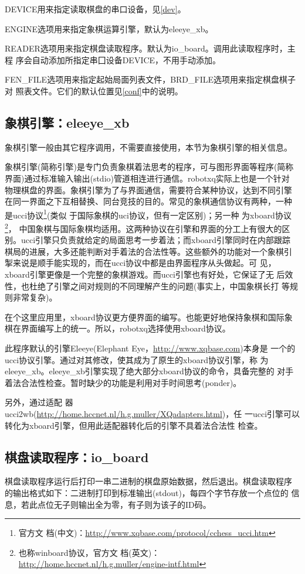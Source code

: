\documentclass[a4paper]{article}
\begin{document}
DEVICE用来指定读取棋盘的串口设备，见\ref{dev}。

ENGINE选项用来指定象棋运算引擎，默认为eleeye\_xb。

READER选项用来指定棋盘读取程序。默认为io\_board。调用此读取程序时，主程
序会自动添加所指定串囗设备DEVICE，不用手动添加。

FEN\_FILE选项用来指定起始局面列表文件，BRD\_FILE选项用来指定棋盘棋子对
照表文件。它们的默认位置见\ref{conf}中的说明。


\subsection{象棋引擎：eleeye\_xb}
象棋引擎一般由其它程序调用，不需要直接使用，本节为象棋引擎的相关信息。

象棋引擎(简称引擎)是专门负责象棋着法思考的程序，可与图形界面等程序(简称
界面)通过标准输入输出(stdio)管道相连进行通信。robotxq实际上也是一个针对
物理棋盘的界面。象棋引擎为了与界面通信，需要符合某种协议，达到不同引擎
在同一界面之下互相替换、同台竞技的目的。常见的象棋通信协议有两种，一种
是ucci协议\footnote{官方文
  档(中文)：\url{http://www.xqbase.com/protocol/cchess_ucci.htm}}(类似
于国际象棋的uci协议，但有一定区别)；另一种
为xboard协议\footnote{也称winboard协议，官方文
  档(英文)：\url{http://home.hccnet.nl/h.g.muller/engine-intf.html}}，
中国象棋与国际象棋均适用。这两种协议在引擎和界面的分工上有很大的区
别。ucci引擎只负责就给定的局面思考一步着法；而xboard引擎同时在内部跟踪
棋局的进展，大多还能判断对手着法的合法性等。这些额外的功能对一个象棋引
掣来说是顺手能实现的，而在ucci协议中都是由界面程序从头做起。可
见，xboard引擎更像是一个完整的象棋游戏。而ucci引擎也有好处，它保证了无
后效性，也杜绝了引擎之间对规则的不同理解产生的问题(事实上，中国象棋长打
等规则非常复杂)。

在个这里应用里，xboard协议更方便界面的编写。也能更好地保持象棋和国际象
棋在界面编写上的统一。所以，robotxq选择使用xboard协议。

此程序默认的引擎Eleeye(Elephant Eye，\url{http://www.xqbase.com})本身是
一个的ucci协议引擎。通过对其修改，使其成为了原生的xboard协议引擎，称
为eleeye\_xb。eleeye\_xb引擎实现了绝大部分xboard协议的命令，具备完整的
对手着法合法性检查。暂时缺少的功能是利用对手时间思考(ponder)。

另外，通过适配
器ucci2wb(\url{http://home.hccnet.nl/h.g.muller/XQadapters.html})，任
一ucci引擎可以转化为xboard引擎，但用此适配器转化后的引擎不具着法合法性
检查。

\subsection{棋盘读取程序：io\_board}
\label{iob}
棋盘读取程序运行后打印一串二进制的棋盘原始数据，然后退出。棋盘读取程序
的输出格式如下：二进制打印到标准输出(stdout)，每四个字节存放一个点位的
信息，若此点位无子则输出全为零，有子则为该子的ID码。
\end{document}
